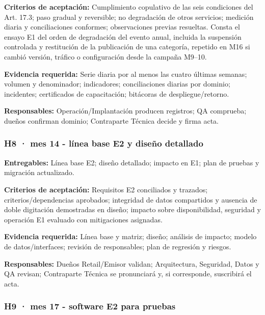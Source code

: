 \documentclass[11pt]{article}
\begin{document}
\textbf{Criterios de aceptación:} Cumplimiento copulativo de las seis condiciones del Art. 17.3; paso gradual y reversible; no degradación de otros servicios; medición diaria y conciliaciones conformes; observaciones previas resueltas. Consta el ensayo E1 del orden de degradación del evento anual, incluida la suspensión controlada y restitución de la publicación de una categoría, repetido en M16 si cambió versión, tráfico o configuración desde la campaña M9--10.

\textbf{Evidencia requerida:} Serie diaria por al menos las cuatro últimas semanas; volumen y denominador; indicadores; conciliaciones diarias por dominio; incidentes; certificados de capacitación; bitácoras de despliegue/retorno.

\textbf{Responsables:} Operación/Implantación producen registros; QA comprueba; dueños confirman dominio; Contraparte Técnica decide y firma acta.

\subsubsection{\texorpdfstring{\textbf{H8 · mes 14} - línea base E2 y diseño detallado}{H8 · mes 14 - línea base E2 y diseño detallado}}\label{t17-h8-mes-14-luxednea-base-e2-y-diseuxf1o-detallado}

\textbf{Entregables:} Línea base E2; diseño detallado; impacto en E1; plan de pruebas y migración actualizado.

\textbf{Criterios de aceptación:} Requisitos E2 conciliados y trazados; criterios/dependencias aprobados; integridad de datos compartidos y ausencia de doble digitación demostradas en diseño; impacto sobre disponibilidad, seguridad y operación E1 evaluado con mitigaciones asignadas.

\textbf{Evidencia requerida:} Línea base y matriz; diseño; análisis de impacto; modelo de datos/interfaces; revisión de responsables; plan de regresión y riesgos.

\textbf{Responsables:} Dueños Retail/Emisor validan; Arquitectura, Seguridad, Datos y QA revisan; Contraparte Técnica se pronunciará y, si corresponde, suscribirá el acta.

\subsubsection{\texorpdfstring{\textbf{H9 · mes 17} - software E2 para pruebas}{H9 · mes 17 - software E2 para pruebas}}\label{t17-h9-mes-17-software-e2-para-pruebas}
\end{document}
